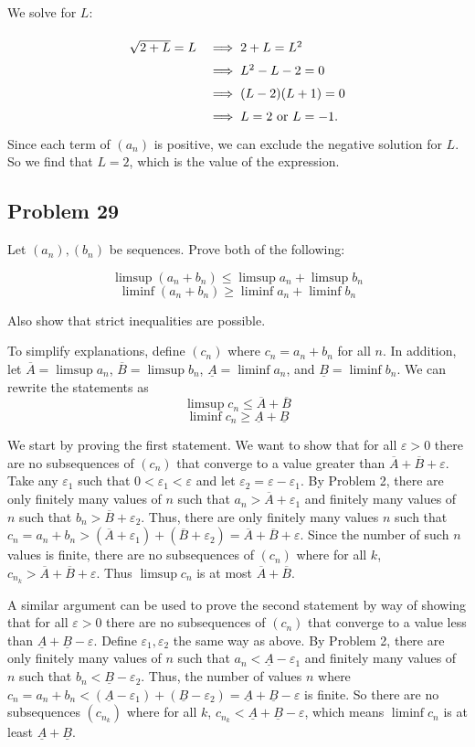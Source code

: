 \documentclass[11pt]{article}
\begin{document}
We solve for $L$:

\[
\def\arraystretch{1.5}
\begin{array}{rl}
\sqrt{2+L}=L &\implies 2+L=L^2 \\
&\implies L^2-L-2=0 \\
&\implies (L-2)(L+1)=0 \\
&\implies L=2 \textrm{ or } L=-1.
\end{array}
\]
Since each term of $(a_n)$ is positive, we can exclude the negative solution
for $L$. So we find that $L=2$, which is the value of the expression.

\subsection*{Problem 29}

Let $(a_n), (b_n)$ be sequences. Prove both of the following:

\[\limsup(a_n+b_n)\leq\limsup a_n + \limsup b_n \]
\[\liminf(a_n+b_n)\geq\liminf a_n + \liminf b_n \]

Also show that strict inequalities are possible.

To simplify explanations, define $(c_n)$ where $c_n = a_n + b_n$ for all $n$.
In addition, let $\overline{A}=\limsup a_n$, $\overline{B}=\limsup b_n$,
$\underline{A}=\liminf a_n$, and $\underline{B}=\liminf b_n$.
We can rewrite the statements as
\[\limsup c_n\leq\overline{A}+\overline{B}\]
\[\liminf c_n\geq\underline{A}+\underline{B}\]

We start by proving the first statement. We want to show that for all 
$\varepsilon>0$ there are no subsequences of $(c_n)$ that converge to a value
greater than
$\overline{A}+\overline{B}+\varepsilon$. Take any $\varepsilon_1$ such that
$0<\varepsilon_1<\varepsilon$ and let $\varepsilon_2=\varepsilon-\varepsilon_1$.
By Problem 2, there are only finitely many values of $n$ such that
$a_n>\overline{A}+\varepsilon_1$ and finitely many values of $n$ such that
$b_n>\overline{B}+\varepsilon_2$. Thus, there are only finitely many values
$n$ such that $c_n = a_n+b_n > (\overline{A}+\varepsilon_1)+
(\overline{B}+\varepsilon_2) = \overline{A}+\overline{B}+\varepsilon$. Since
the number of such $n$ values is finite, there are no subsequences of $(c_n)$
where for all $k$, $c_{n_k} > \overline{A}+\overline{B}+\varepsilon$. Thus
$\limsup c_n$ is at most $\overline{A}+\overline{B}$.

A similar argument can be used to prove the second statement by way of showing
that for all $\varepsilon > 0$ there are no subsequences of $(c_n)$ that converge
to a value less than
$\underline{A}+\underline{B}-\varepsilon$. Define $\varepsilon_1, \varepsilon_2$
the same way as above.
By Problem 2, there are only finitely many values of $n$ such that
$a_n<\underline{A}-\varepsilon_1$ and finitely many values of $n$ such that
$b_n<\underline{B}-\varepsilon_2$. Thus, the number of values $n$ where
$c_n = a_n+b_n < (\underline{A}-\varepsilon_1)+(\underline{B}-\varepsilon_2) =
\underline{A}+\underline{B}-\varepsilon$ is finite. So there are no subsequences
$(c_{n_k})$ where for all $k$, $c_{n_k} < \underline{A} + \underline{B}-\varepsilon$,
which means $\liminf c_n$ is at least $\underline{A} + \underline{B}$.
\end{document}
